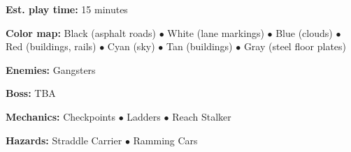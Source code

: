 \documentclass[12pt]{article}
\begin{document}
\begin{multicols}{2}
\indent\indent \textbf{Est. play time:} 15 minutes
\begin{addmargin}[5mm]{0em}
\textbf{Color map:} Black (asphalt roads) $\bullet$ White (lane markings) $\bullet$ Blue (clouds) $\bullet$ Red (buildings, rails) $\bullet$ Cyan (sky) $\bullet$ Tan (buildings) $\bullet$ Gray (steel floor plates)
\end{addmargin}
\begin{addmargin}[5mm]{0em}
\textbf{Enemies:} Gangsters
\end{addmargin}
\begin{addmargin}[5mm]{0em}
\textbf{Boss:} TBA %
\end{addmargin}
\begin{addmargin}[5mm]{0em}
\textbf{Mechanics:} Checkpoints $\bullet$ Ladders $\bullet$ Reach Stalker %
\end{addmargin}
\begin{addmargin}[5mm]{0em}
\textbf{Hazards:} Straddle Carrier $\bullet$ Ramming Cars
\end{addmargin}

\end{multicols}
\newpage
\end{document}
